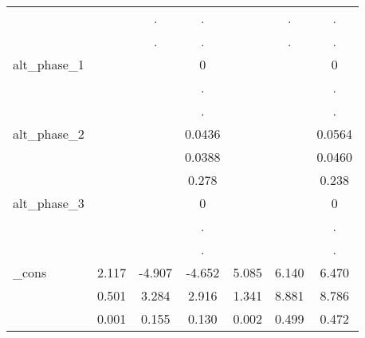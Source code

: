 {\begin{tabular}{l*{6}{c}}
            &                     &           .         &           .         &                     &           .         &           .         \\
            &                     &           .         &           .         &                     &           .         &           .         \\
alt\_phase\_1 &                     &                     &           0         &                     &                     &           0         \\
            &                     &                     &           .         &                     &                     &           .         \\
            &                     &                     &           .         &                     &                     &           .         \\
alt\_phase\_2 &                     &                     &      0.0436         &                     &                     &      0.0564         \\
            &                     &                     &      0.0388         &                     &                     &      0.0460         \\
            &                     &                     &       0.278         &                     &                     &       0.238         \\
alt\_phase\_3 &                     &                     &           0         &                     &                     &           0         \\
            &                     &                     &           .         &                     &                     &           .         \\
            &                     &                     &           .         &                     &                     &           .         \\
\_cons      &       2.117\sym{***}&      -4.907         &      -4.652         &       5.085\sym{**} &       6.140         &       6.470         \\
            &       0.501         &       3.284         &       2.916         &       1.341         &       8.881         &       8.786         \\
            &       0.001         &       0.155         &       0.130         &       0.002         &       0.499         &       0.472         \\

\end{tabular}}
